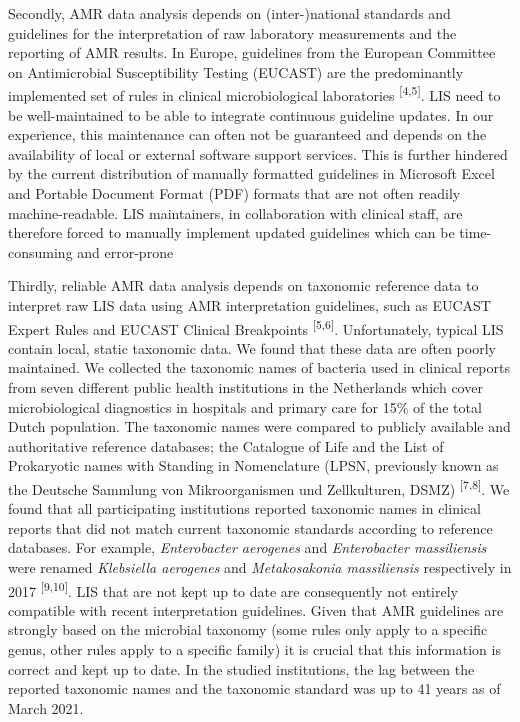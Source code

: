 \documentclass[
]{book}
\begin{document}
Secondly, AMR data analysis depends on (inter-)national standards and guidelines for the interpretation of raw laboratory measurements and the reporting of AMR results. In Europe, guidelines from the European Committee on Antimicrobial Susceptibility Testing (EUCAST) are the predominantly implemented set of rules in clinical microbiological laboratories \textsuperscript{{[}4,5{]}}. LIS need to be well-maintained to be able to integrate continuous guideline updates. In our experience, this maintenance can often not be guaranteed and depends on the availability of local or external software support services. This is further hindered by the current distribution of manually formatted guidelines in Microsoft Excel and Portable Document Format (PDF) formats that are not often readily machine-readable. LIS maintainers, in collaboration with clinical staff, are therefore forced to manually implement updated guidelines which can be time-consuming and error-prone

Thirdly, reliable AMR data analysis depends on taxonomic reference data to interpret raw LIS data using AMR interpretation guidelines, such as EUCAST Expert Rules and EUCAST Clinical Breakpoints \textsuperscript{{[}5,6{]}}. Unfortunately, typical LIS contain local, static taxonomic data. We found that these data are often poorly maintained. We collected the taxonomic names of bacteria used in clinical reports from seven different public health institutions in the Netherlands which cover microbiological diagnostics in hospitals and primary care for 15\% of the total Dutch population. The taxonomic names were compared to publicly available and authoritative reference databases; the Catalogue of Life and the List of Prokaryotic names with Standing in Nomenclature (LPSN, previously known as the Deutsche Sammlung von Mikroorganismen und Zellkulturen, DSMZ) \textsuperscript{{[}7,8{]}}. We found that all participating institutions reported taxonomic names in clinical reports that did not match current taxonomic standards according to reference databases. For example, \emph{Enterobacter aerogenes} and \emph{Enterobacter massiliensis} were renamed \emph{Klebsiella aerogenes} and \emph{Metakosakonia massiliensis} respectively in 2017 \textsuperscript{{[}9,10{]}}. LIS that are not kept up to date are consequently not entirely compatible with recent interpretation guidelines. Given that AMR guidelines are strongly based on the microbial taxonomy (some rules only apply to a specific genus, other rules apply to a specific family) it is crucial that this information is correct and kept up to date. In the studied institutions, the lag between the reported taxonomic names and the taxonomic standard was up to 41 years as of March 2021.
\end{document}
